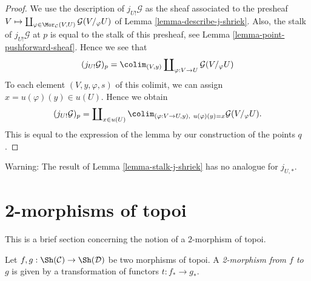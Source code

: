 \begin{proof}
We use the description of $j_{U!}\mathcal{G}$ as the sheaf associated
to the presheaf
$V \mapsto
\coprod\nolimits_{\varphi \in \Mor_\mathcal{C}(V, U)}
\mathcal{G}(V/_\varphi U)$
of
Lemma \ref{lemma-describe-j-shriek}.
Also, the stalk of $j_{U!}\mathcal{G}$ at $p$ is equal to the
stalk of this presheaf, see
Lemma \ref{lemma-point-pushforward-sheaf}.
Hence we see that
$$
(j_{U!}\mathcal{G})_p =
\colim_{(V, y)} \coprod\nolimits_{\varphi : V \to U} \mathcal{G}(V/_\varphi U)
$$
To each element $(V, y, \varphi, s)$ of this colimit, we can assign
$x = u(\varphi)(y) \in u(U)$. Hence we obtain
$$
(j_{U!}\mathcal{G})_p =
\coprod\nolimits_{x \in u(U)}
\colim_{(\varphi : V \to U, y), \ u(\varphi)(y) = x} \mathcal{G}(V/_\varphi U).
$$
This is equal to the expression of the lemma by our
construction of the points $q$.
\end{proof}

\begin{remark}
\label{remark-not-pushforward}
Warning: The result of
Lemma \ref{lemma-stalk-j-shriek}
has no analogue for $j_{U, *}$.
\end{remark}




\section{2-morphisms of topoi}
\label{section-2-category}

\noindent
This is a brief section concerning the notion of a $2$-morphism
of topoi.

\begin{definition}
\label{definition-2-morphism-topoi}
Let $f, g : \Sh(\mathcal{C}) \to \Sh(\mathcal{D})$
be two morphisms of topoi. A {\it 2-morphism from $f$ to $g$}
is given by a transformation of functors $t : f_* \to g_*$.
\end{definition}

